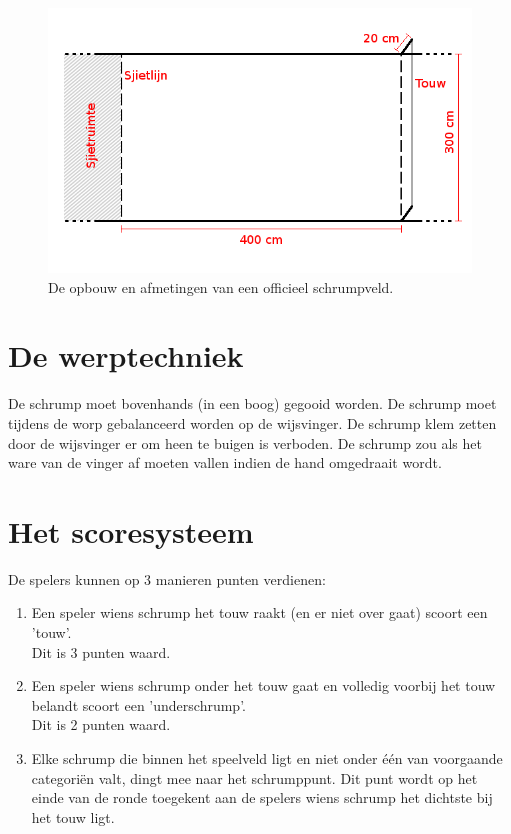\documentclass[a4paper,12pt,titlepage]{article}
\begin{document}
\begin{figure}[h]
\centering
\includegraphics[width=\textwidth]{veld}
\caption{De opbouw en afmetingen van een officieel schrumpveld.}
\label{fig:veld}
\end{figure}

\newpage

\section{De werptechniek} \label{sec:techniek}

De schrump moet bovenhands (in een boog) gegooid worden. De schrump moet tijdens de worp gebalanceerd worden op de wijsvinger. De schrump klem zetten door de wijsvinger er om heen te buigen is 
verboden. De schrump zou als het ware van de vinger af moeten vallen indien de hand omgedraait wordt.

\newpage
\section{Het scoresysteem}

De spelers kunnen op 3 manieren punten verdienen:

\begin{enumerate}
\item Een speler wiens schrump het touw raakt (en er niet over gaat) scoort een 'touw'. \\Dit is 3 punten waard.
\item Een speler wiens schrump onder het touw gaat en volledig voorbij het touw belandt scoort een 'underschrump'. \\Dit is 2 punten waard.
\item Elke schrump die binnen het speelveld ligt en niet onder \'e\'en van voorgaande categori\"en valt, dingt mee naar het schrumppunt. Dit punt wordt op het 
      einde van de ronde toegekent aan de spelers wiens schrump het dichtste bij het touw ligt.
\end{enumerate}
\end{document}
